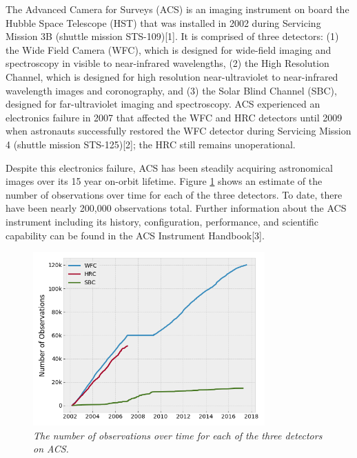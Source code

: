 \documentclass[10pt,journal,compsoc]{IEEEtran}
\begin{document}
The Advanced Camera for Surveys (ACS) is an imaging instrument on board the Hubble Space Telescope (HST) that was
installed in 2002 during Servicing Mission 3B (shuttle mission STS-109)[1]. It is comprised of three detectors: (1) the Wide Field Camera
(WFC), which is designed for wide-field imaging and spectroscopy in visible to near-infrared wavelengths, (2) the High Resolution Channel,
which is designed for high resolution near-ultraviolet to near-infrared wavelength images and coronography, and (3) the Solar Blind
Channel (SBC), designed for far-ultraviolet imaging and spectroscopy.  ACS experienced an electronics failure in 2007 that affected
the WFC and HRC detectors until 2009 when astronauts successfully restored the WFC detector during Servicing Mission 4 (shuttle mission
STS-125)[2]; the HRC still remains unoperational.

Despite this electronics failure, ACS has been steadily acquiring astronomical images over its 15 year on-orbit lifetime.
Figure \ref{fig1} shows an estimate of the number of observations over time for each of the three detectors.  To date, there have been
nearly 200,000 observations total.  Further information about the ACS instrument including its history, configuration, performance, and
scientific capability can be found in the ACS Instrument Handbook[3].

\begin{figure}[!t]
\centering
\includegraphics[width=3.5in]{./figures/num_obs.png}
\caption{\textit{The number of observations over time for each of the three detectors on ACS.}}
\label{fig1}
\end{figure}
\end{document}

